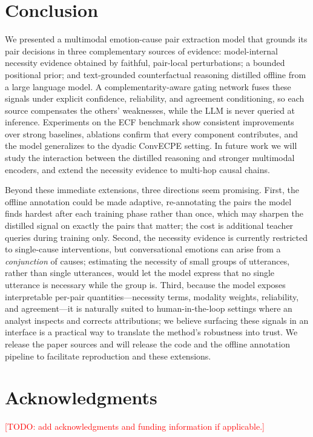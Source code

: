 \documentclass[journal]{IEEEtran}
\newcommand{\todo}[1]{\textcolor{red}{[TODO: #1]}}
\begin{document}
\section{Conclusion}
\label{sec:conclusion}
We presented a multimodal emotion-cause pair extraction model that grounds its pair decisions
in three complementary sources of evidence: model-internal necessity evidence obtained by
faithful, pair-local perturbations; a bounded positional prior; and text-grounded counterfactual
reasoning distilled offline from a large language model. A complementarity-aware gating network
fuses these signals under explicit confidence, reliability, and agreement conditioning, so each
source compensates the others' weaknesses, while the LLM is never queried at inference.
Experiments on the ECF benchmark show consistent improvements over strong baselines, ablations
confirm that every component contributes, and the model generalizes to the dyadic ConvECPE
setting. %
In future work we will study the interaction between the distilled reasoning and stronger
multimodal encoders, and extend the necessity evidence to multi-hop causal chains.

Beyond these immediate extensions, three directions seem promising. First, the offline
annotation could be made adaptive, re-annotating the pairs the model finds hardest after each
training phase rather than once, which may sharpen the distilled signal on exactly the pairs
that matter; the cost is additional teacher queries during training only. Second, the necessity
evidence is currently restricted to single-cause interventions, but conversational emotions can
arise from a \emph{conjunction} of causes; estimating the necessity of small groups of
utterances, rather than single utterances, would let the model express that no single utterance
is necessary while the group is. Third, because the model exposes interpretable per-pair
quantities---necessity terms, modality weights, reliability, and agreement---it is naturally
suited to human-in-the-loop settings where an analyst inspects and corrects attributions; we
believe surfacing these signals in an interface is a practical way to translate the method's
robustness into trust. We release the paper sources and will release the code and the offline
annotation pipeline to facilitate reproduction and these extensions.

\section*{Acknowledgments}
\todo{add acknowledgments and funding information if applicable.}



\end{document}
